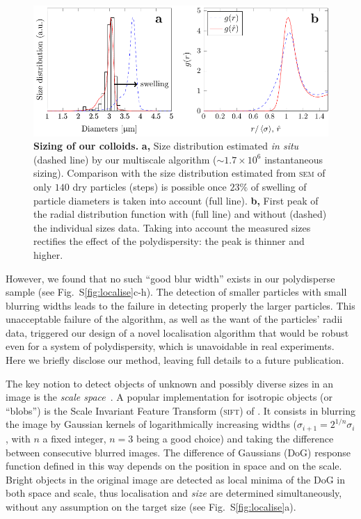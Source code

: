 \documentclass[prl,twocolumn,notitlepage]{revtex4-1}
\begin{document}
\begin{figure}
\begin{center}
\includegraphics{generate_figures-figure6.pdf}
\end{center}
	\caption{\textbf{Sizing of our colloids.} \textbf{a,} Size distribution estimated \emph{in situ} (dashed line) by our multiscale algorithm ($\sim 1.7\times 10^6$ instantaneous sizing). Comparison with the size distribution estimated from \textsc{sem} of only $140$ dry particles (steps) is possible once $23\%$ of swelling of particle diameters is taken into account (full line). \textbf{b,} First peak of the radial distribution function with (full line) and without (dashed) the individual sizes data. Taking into account the measured sizes rectifies the effect of the polydispersity: the peak is thinner and higher.}
	\label{fig:sizing}
\end{figure}

However, we found that no such ``good blur width'' exists in our polydisperse sample (see Fig.~S\ref{fig:localise}c-h). The detection of smaller particles with small blurring widths leads to the failure in detecting properly the larger particles. This unacceptable failure of the \citet{Crocker1996} algorithm, as well as the want of the particles' radii data, triggered our design of a novel localisation algorithm that would be robust even for a system of polydispersity, which is unavoidable in real experiments. Here we briefly disclose our method, leaving full details to a future publication.

The key notion to detect objects of unknown and possibly diverse sizes in an image is the \emph{scale space}~\cite{Lindeberg1993}. A popular implementation for isotropic objects (or ``blobs'') is the Scale Invariant Feature Transform (\textsc{sift}) of \citet{Lowe2004}. It consists  in blurring the image by Gaussian kernels of logarithmically increasing widths ($\sigma_{i+1} = 2^{1/n} \sigma_i$, with $n$ a fixed integer, $n=3$ being a good choice) and taking the difference between consecutive blurred images. The difference of Gaussians (DoG) response function defined in this way depends on the position in space and on the scale. Bright objects in the original image are detected as local minima of the DoG in both space and scale, thus localisation and \emph{size} are determined simultaneously, without any assumption on the target size (see Fig.~S\ref{fig:localise}a).
\end{document}

